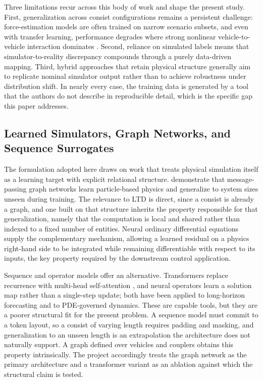 \documentclass[numbered]{trbunofficial}
\begin{document}
Three limitations recur across this body of work and shape the present study. First, generalization across consist configurations remains a persistent challenge: force-estimation models are often trained on narrow scenario subsets, and even with transfer learning, performance degrades where strong nonlinear vehicle-to-vehicle interaction dominates \citep{zhang_in_train_forces,intrainnet}. Second, reliance on simulated labels means that simulator-to-reality discrepancy compounds through a purely data-driven mapping. Third, hybrid approaches that retain physical structure generally aim to replicate nominal simulator output rather than to achieve robustness under distribution shift. In nearly every case, the training data is generated by a tool that the authors do not describe in reproducible detail, which is the specific gap this paper addresses.

\subsection{Learned Simulators, Graph Networks, and Sequence Surrogates}

The formulation adopted here draws on work that treats physical simulation itself as a learning target with explicit relational structure. \citet{sanchez2020gns} demonstrate that message-passing graph networks learn particle-based physics and generalize to system sizes unseen during training. The relevance to LTD is direct, since a consist is already a graph, and one built on that structure inherits the property responsible for that generalization, namely that the computation is local and shared rather than indexed to a fixed number of entities. Neural ordinary differential equations \citep{chen2018neuralode} supply the complementary mechanism, allowing a learned residual on a physics right-hand side to be integrated while remaining differentiable with respect to its inputs, the key property required by the downstream control application.

Sequence and operator models offer an alternative. Transformers replace recurrence with multi-head self-attention \citep{vaswani2017attention}, and neural operators learn a solution map rather than a single-step update; both have been applied to long-horizon forecasting and to PDE-governed dynamics. These are capable tools, but they are a poorer structural fit for the present problem. A sequence model must commit to a token layout, so a consist of varying length requires padding and masking, and generalization to an unseen length is an extrapolation the architecture does not naturally support. A graph defined over vehicles and couplers obtains this property intrinsically. The project accordingly treats the graph network as the primary architecture and a transformer variant as an ablation against which the structural claim is tested.
\end{document}

